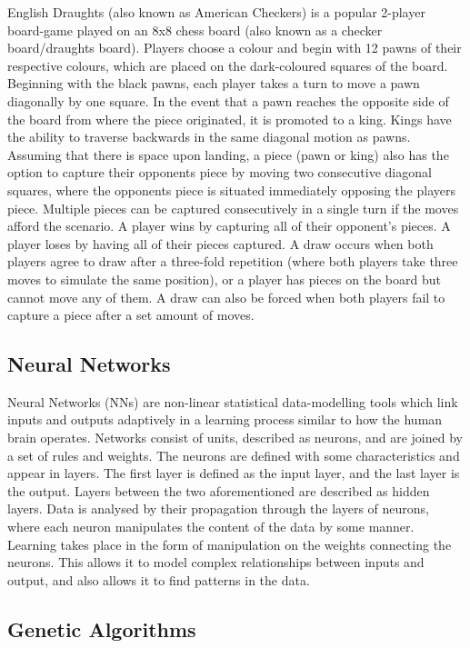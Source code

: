 \documentclass[12pt,a4paper]{article}
\begin{document}
    English Draughts (also known as American Checkers) is a popular 2-player board-game played on an 8x8 chess board (also known as a checker board/draughts board). Players choose a colour and begin with 12 pawns of their respective colours, which are placed on the dark-coloured squares of the board. Beginning with the black pawns, each player takes a turn to move a pawn diagonally by one square. In the event that a pawn reaches the opposite side of the board from where the piece originated, it is promoted to a king. Kings have the ability to traverse backwards in the same diagonal motion as pawns. Assuming that there is space upon landing, a piece (pawn or king) also has the option to capture their opponents piece by moving two consecutive diagonal squares, where the opponents piece is situated immediately opposing the players piece. Multiple pieces can be captured consecutively in a single turn if the moves afford the scenario. A player wins by capturing all of their opponent's pieces. A player loses by having all of their pieces captured. A draw occurs when both players agree to draw after a three-fold repetition (where both players take three moves to simulate the same position), or a player has pieces on the board but cannot move any of them. A draw can also be forced when both players fail to capture a piece after a set amount of moves.

    \subsection{Neural Networks}

    Neural Networks (NNs) are non-linear statistical data-modelling tools which link inputs and outputs adaptively in a learning process similar to how the human brain operates. Networks consist of units, described as neurons, and are joined by a set of rules and weights. The neurons are defined with some characteristics and appear in layers. The first layer is defined as the input layer, and the last layer is the output. Layers between the two aforementioned are described as hidden layers. Data is analysed by their propagation through the layers of neurons, where each neuron manipulates the content of the data by some manner. Learning takes place in the form of manipulation on the weights connecting the neurons. This allows it to model complex relationships between inputs and output, and also allows it to find patterns in the data. 

 	\subsection{Genetic Algorithms}
\end{document}
